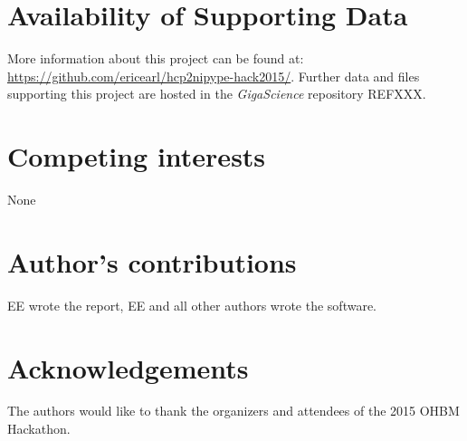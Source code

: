 \documentclass[twocolumn]{bmcart}%
\begin{document}
\begin{backmatter}

\section*{Availability of Supporting Data}
More information about this project can be found at: \url{https://github.com/ericearl/hcp2nipype-hack2015/}. Further data and files supporting this project are hosted in the \emph{GigaScience} repository REFXXX.

\section*{Competing interests}
None

\section*{Author's contributions}
EE wrote the report, EE and all other authors wrote the software.

\section*{Acknowledgements}
The authors would like to thank the organizers and attendees of the 2015
OHBM Hackathon.

  
  


\end{backmatter}
\end{document}
